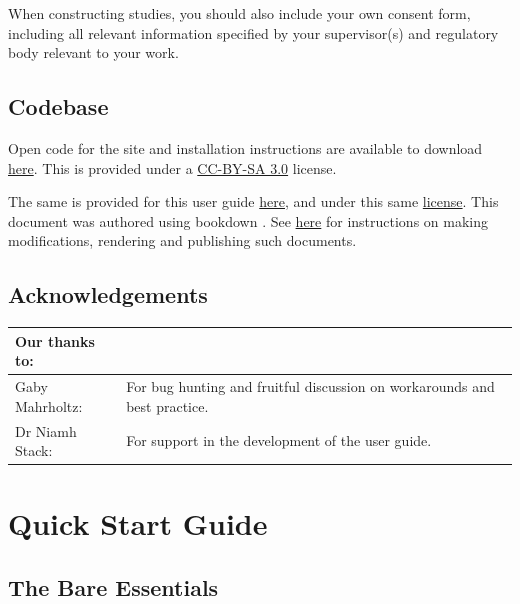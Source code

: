 \documentclass[]{book}
\begin{document}
When constructing studies, you should also include your own consent form, including all relevant information specified by your supervisor(s) and regulatory body relevant to your work.

\hypertarget{codebase}{%
\section*{Codebase}\label{codebase}}

Open code for the site and installation instructions are available to download \href{https://github.com/debruine/experimentum}{here}. This is provided under a \href{https://creativecommons.org/licenses/by-sa/3.0/legalcode}{CC-BY-SA 3.0} license.

The same is provided for this user guide \href{https://github.com/RebeccaJLai/exp_manual}{here}, and under this same \href{https://creativecommons.org/licenses/by-sa/3.0/legalcode}{license}. This document was authored using bookdown \citep{R-bookdown}. See \href{https://bookdown.org/yihui/bookdown/}{here} for instructions on making modifications, rendering and publishing such documents.

\hypertarget{acknowledgements}{%
\section*{Acknowledgements}\label{acknowledgements}}

\begin{tabular}{l|l}
\hline
Our thanks to: &  \\
\hline
Gaby Mahrholtz: & For bug hunting and fruitful discussion on workarounds and best practice.\\
\hline
Dr Niamh Stack: & For support in the development of the user guide.\\
\hline
\end{tabular}

\hypertarget{quick-start-guide}{%
\chapter{Quick Start Guide}\label{quick-start-guide}}

\hypertarget{the-bare-essentials}{%
\section{The Bare Essentials}\label{the-bare-essentials}}
\end{document}
